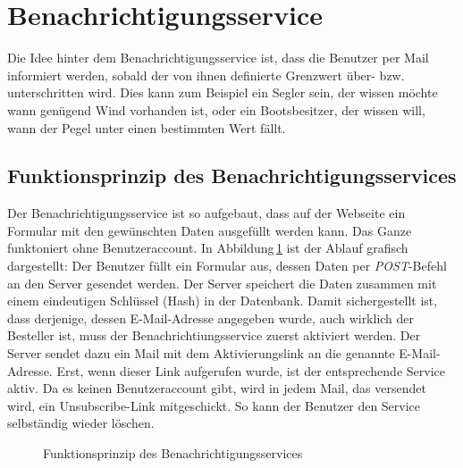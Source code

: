 \section{Benachrichtigungsservice}
\label{notifications}
Die Idee hinter dem Benachrichtigungsservice ist, dass die Benutzer per Mail informiert werden, sobald der von ihnen definierte Grenzwert über- bzw. unterschritten wird. Dies kann zum Beispiel ein Segler sein, der wissen möchte wann genügend Wind vorhanden ist, oder ein Bootsbesitzer, der wissen will, wann der Pegel unter einen bestimmten Wert fällt.


\subsection{Funktionsprinzip des Benachrichtigungsservices}

Der Benachrichtigungsservice ist so aufgebaut, dass auf der Webseite ein Formular mit den gewünschten Daten ausgefüllt werden kann. Das Ganze funktoniert ohne Benutzeraccount. In Abbildung\,\ref{img:notificationKonzept} ist der Ablauf grafisch dargestellt: Der Benutzer füllt ein Formular aus, dessen Daten per \emph{POST}-Befehl an den Server gesendet werden. Der Server speichert die Daten zusammen mit einem eindeutigen Schlüssel (Hash) in der Datenbank. Damit sichergestellt ist, dass derjenige, dessen E-Mail-Adresse angegeben wurde, auch wirklich der Besteller ist, muss der Benachrichtiungsservice zuerst aktiviert werden. Der Server sendet dazu ein Mail mit dem Aktivierungslink an die genannte E-Mail-Adresse. Erst, wenn dieser Link aufgerufen wurde, ist der entsprechende Service aktiv. Da es keinen Benutzeraccount gibt, wird in jedem Mail, das versendet wird, ein Unsubscribe-Link mitgeschickt. So kann der Benutzer den Service selbständig wieder löschen.

\begin{figure}[h!]
	\centering
	\caption{Funktionsprinzip des Benachrichtigungsservices}
	\label{img:notificationKonzept}
\end{figure}

